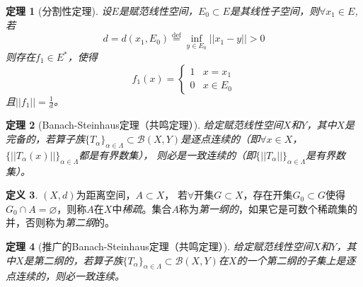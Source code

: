 \documentclass[winfonts,UTF8,c5size,a4paper,fancyhdr,hyperref,titlepage,nocap]{ctexart}
\theoremstyle{question}
\theoremstyle{theorem}
\newtheorem{thm}{定理}
\theoremstyle{definition}
\newtheorem{defn}[thm]{定义}
\theoremstyle{remark}
\numberwithin{equation}{subsection}
\newcommand{\red}{\color{red}}
\newcommand{\defeq}{\stackrel{{\mathrm{def}}}{=}}
\begin{document}
\begin{thm}[分割性定理]
  设$E$是赋范线性空间，$E_0\subset E$是其线性子空间，则$\forall x_1\in E$,若
  \begin{equation*}
  d=d(x_1,E_0)\defeq\inf_{y\in E_0}||x_1-y||>0
  \end{equation*}
  则存在$f_1\in E^{\ast}$，使得
  \begin{equation*}
   f_1(x)=
    \begin{cases}
    1&x=x_1\\
    0&x\in E_0
    \end{cases}
  \end{equation*}
且$||f_1||=\frac{1}{d}$。
\end{thm}

\begin{thm}[Banach-Steinhaus定理（共鸣定理）]
  给定赋范线性空间$X$和$Y$，其中$X$是完备的，若算子族$\{T_{\alpha}\}_{\alpha\in\Lambda}\subset \mathcal{B}(X,Y)$是{\red 逐点连续}的（即$\forall x\in X$，$\{||T_{\alpha}(x)||\}_{\alpha\in\Lambda}$都是有界数集），
  则必是{\red 一致连续}的（即$\{||T_{\alpha}||\}_{\alpha\in\Lambda}$是有界数集）。
\end{thm}

\begin{defn}
  $(X,d)$为距离空间，$A\subset X$， 若$\forall$开集$G\subset X$，存在开集$G_0\subset G$使得$G_0\cap A=\varnothing$，则称$A$在$X$中\emph{\red 稀疏}。集合$A$称为\emph{\red 第一纲的}，如果它是可数个稀疏集的并，否则称为\emph{\red 第二纲}的。
\end{defn}

\begin{thm}[推广的Banach-Steinhaus定理（共鸣定理）]
  给定赋范线性空间$X$和$Y$，其中$X$是{\red 第二纲的}，若算子族$\{T_{\alpha}\}_{\alpha\in\Lambda}\subset \mathcal{B}(X,Y)$在$X$的一个第二纲的子集上是{\red 逐点连续}的，则必{\red 一致连续}。
\end{thm}
\end{document}
